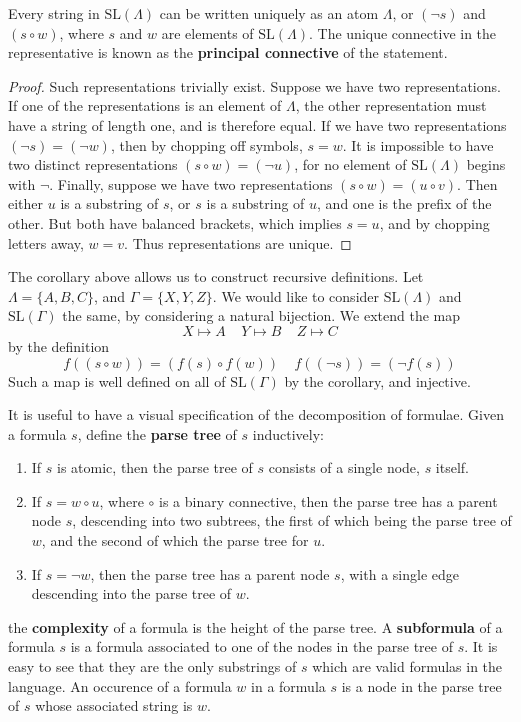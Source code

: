 \begin{corollary}
    Every string in $\text{SL}(\Lambda)$ can be written uniquely as an atom $\Lambda$, or $(\neg s)$ and $(s \circ w)$, where $s$ and $w$ are elements of $\text{SL}(\Lambda)$. The unique connective in the representative is known as the {\bf principal connective} of the statement.
\end{corollary}
\begin{proof}
    Such representations trivially exist. Suppose we have two representations. If one of the representations is an element of $\Lambda$, the other representation must have a string of length one, and is therefore equal. If we have two representations $(\neg s) = (\neg w)$, then by chopping off symbols, $s = w$. It is impossible to have two distinct representations $(s \circ w) = (\neg u)$, for no element of $\text{SL}(\Lambda)$ begins with $\neg$. Finally, suppose we have two representations $(s \circ w) = (u \circ v)$. Then either $u$ is a substring of $s$, or $s$ is a substring of $u$, and one is the prefix of the other. But both have balanced brackets, which implies $s = u$, and by chopping letters away, $w = v$. Thus representations are unique.
\end{proof}

The corollary above allows us to construct recursive definitions. Let $\Lambda = \{ A, B, C \}$, and $\Gamma = \{ X, Y, Z \}$. We would like to consider $\text{SL}(\Lambda)$ and $\text{SL}(\Gamma)$ the same, by considering a natural bijection. We extend the map
%
\[ X \mapsto A\ \ \ \ \ Y \mapsto B\ \ \ \ \ Z \mapsto C \]
%
by the definition
%
\[ f((s \circ w)) = (f(s) \circ f(w))\ \ \ \ \ f((\neg s)) = (\neg f(s)) \]
%
Such a map is well defined on all of $\text{SL}(\Gamma)$ by the corollary, and injective.

It is useful to have a visual specification of the decomposition of formulae. Given a formula $s$, define the {\bf parse tree} of $s$ inductively:
%
\begin{enumerate}
    \item If $s$ is atomic, then the parse tree of $s$ consists of a single node, $s$ itself.
    \item If $s = w \circ u$, where $\circ$ is a binary connective, then the parse tree has a parent node $s$, descending into two subtrees, the first of which being the parse tree of $w$, and the second of which the parse tree for $u$.
    \item If $s = \neg w$, then the parse tree has a parent node $s$, with a single edge descending into the parse tree of $w$.
\end{enumerate}
%
the {\bf complexity} of a formula is the height of the parse tree. A {\bf subformula} of a formula $s$ is a formula associated to one of the nodes in the parse tree of $s$. It is easy to see that they are the only substrings of $s$ which are valid formulas in the language. An occurence of a formula $w$ in a formula $s$ is a node in the parse tree of $s$ whose associated string is $w$.

